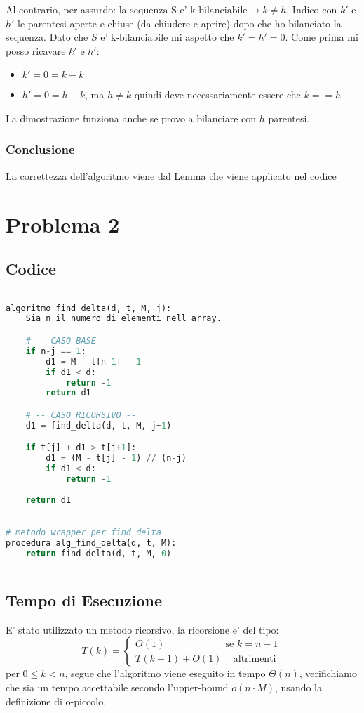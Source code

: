 \documentclass{article}
\begin{document}
    Al contrario, per assurdo: $\text{la sequenza S e' k-bilanciabile} \to k \neq h$. 
    Indico con $k'$ e $h'$ le parentesi aperte e chiuse (da chiudere e aprire) dopo che ho bilanciato la sequenza. 
    Dato che $S$ e' $\text{k-bilanciabile}$ mi aspetto che $k'=h'=0$. 
    Come prima mi posso ricavare $k'$ e $h'$:
    \begin{itemize}
        \item $k' = 0 = k-k$
        \item $h' = 0 = h-k$, ma $h\neq k$ quindi deve necessariamente essere che $k==h$
    \end{itemize}

    La dimostrazione funziona anche se provo a bilanciare con $h$ parentesi.
\subsubsection {Conclusione }
    La correttezza dell'algoritmo viene dal Lemma che viene applicato nel codice

\newpage

\section{ Problema 2 }

\subsection{ Codice }
\begin{lstlisting}[language=Python]

algoritmo find_delta(d, t, M, j):
    Sia n il numero di elementi nell array.

    # -- CASO BASE --
    if n-j == 1:
        d1 = M - t[n-1] - 1
        if d1 < d:
            return -1
        return d1

    # -- CASO RICORSIVO --
    d1 = find_delta(d, t, M, j+1)

    if t[j] + d1 > t[j+1]:
        d1 = (M - t[j] - 1) // (n-j)
        if d1 < d:
            return -1
    
    return d1
    

# metodo wrapper per find_delta
procedura alg_find_delta(d, t, M):
    return find_delta(d, t, M, 0)
    
\end{lstlisting}

\subsection{ Tempo di Esecuzione }
E' stato utilizzato un metodo ricorsivo, la ricorsione e' del tipo: 
$$
T(k) = \begin{cases} 
O(1) \;\;\;\;\;\;\;\;\;\;\;\;\;\;\;\;\;\;\;\;\; \text{ se } k = n-1 \\
T(k+1) + O(1) \;\;\; \text{ altrimenti }
\end{cases}
$$
per $0\leq k< n$, segue che l'algoritmo viene eseguito in tempo $\Theta(n)$, verifichiamo che sia un tempo accettabile secondo l'upper-bound $o(n \cdot M)$, usando la definizione di o-piccolo.
\end{document}
